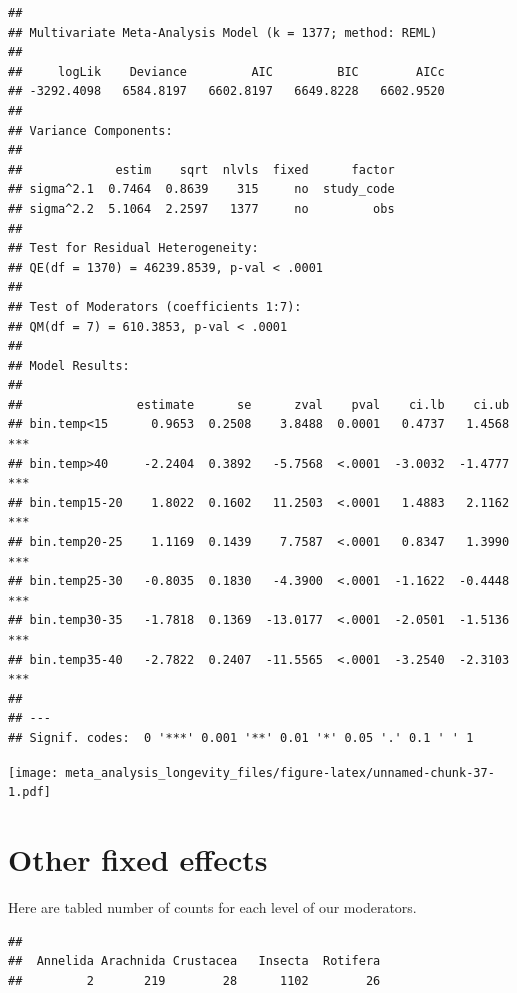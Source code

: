 \documentclass[
]{article}
\newenvironment{Shaded}{\begin{snugshade}}{\end{snugshade}}
\newcommand{\FunctionTok}[1]{\textcolor[rgb]{0.13,0.29,0.53}{\textbf{#1}}}
\newcommand{\NormalTok}[1]{#1}
\newcommand{\SpecialCharTok}[1]{\textcolor[rgb]{0.81,0.36,0.00}{\textbf{#1}}}
\begin{document}
\begin{verbatim}
## 
## Multivariate Meta-Analysis Model (k = 1377; method: REML)
## 
##     logLik    Deviance         AIC         BIC        AICc   
## -3292.4098   6584.8197   6602.8197   6649.8228   6602.9520   
## 
## Variance Components:
## 
##             estim    sqrt  nlvls  fixed      factor 
## sigma^2.1  0.7464  0.8639    315     no  study_code 
## sigma^2.2  5.1064  2.2597   1377     no         obs 
## 
## Test for Residual Heterogeneity:
## QE(df = 1370) = 46239.8539, p-val < .0001
## 
## Test of Moderators (coefficients 1:7):
## QM(df = 7) = 610.3853, p-val < .0001
## 
## Model Results:
## 
##                estimate      se      zval    pval    ci.lb    ci.ub      
## bin.temp<15      0.9653  0.2508    3.8488  0.0001   0.4737   1.4568  *** 
## bin.temp>40     -2.2404  0.3892   -5.7568  <.0001  -3.0032  -1.4777  *** 
## bin.temp15-20    1.8022  0.1602   11.2503  <.0001   1.4883   2.1162  *** 
## bin.temp20-25    1.1169  0.1439    7.7587  <.0001   0.8347   1.3990  *** 
## bin.temp25-30   -0.8035  0.1830   -4.3900  <.0001  -1.1622  -0.4448  *** 
## bin.temp30-35   -1.7818  0.1369  -13.0177  <.0001  -2.0501  -1.5136  *** 
## bin.temp35-40   -2.7822  0.2407  -11.5565  <.0001  -3.2540  -2.3103  *** 
## 
## ---
## Signif. codes:  0 '***' 0.001 '**' 0.01 '*' 0.05 '.' 0.1 ' ' 1
\end{verbatim}

\texttt{[image: meta\_analysis\_longevity\_files/figure-latex/unnamed-chunk-37-1.pdf]}

\newpage

\hypertarget{other-fixed-effects}{%
\section{Other fixed effects}\label{other-fixed-effects}}

Here are tabled number of counts for each level of our moderators.

\begin{Shaded}
\end{Shaded}

\begin{verbatim}
## 
##  Annelida Arachnida Crustacea   Insecta  Rotifera 
##         2       219        28      1102        26
\end{verbatim}
\end{document}
